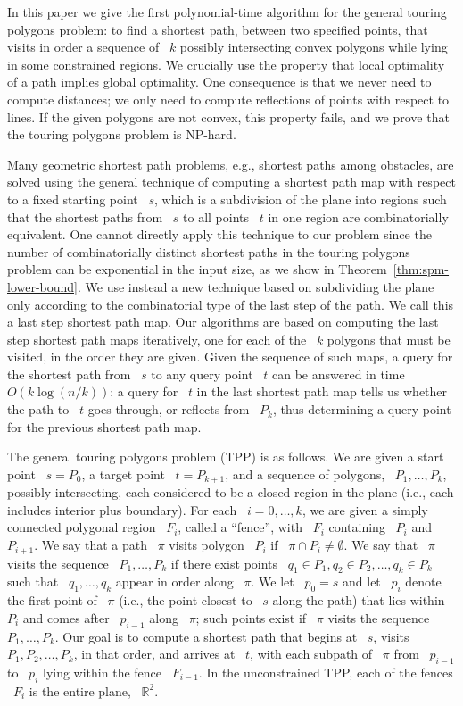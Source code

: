 \documentclass[11pt]{article}
\begin{document}
In this paper we give the first polynomial-time algorithm for the general touring polygons problem: to find a shortest path, between two specified points, that visits in order a sequence of ~\(k\) possibly intersecting convex polygons while lying in some constrained regions.
We crucially use the property that local optimality of a path implies global optimality.
One consequence is that we never need to compute distances; we only need to compute reflections of points with respect to lines.
If the given polygons are not convex, this property fails, and we prove that the touring polygons problem is NP-hard.

Many geometric shortest path problems, e.g., shortest paths among obstacles, are solved using the general technique of computing a shortest path map with respect to a fixed starting point ~\(s\), which is a subdivision of the plane into regions such that the shortest paths from ~\(s\) to all points ~\(t\) in one region are combinatorially equivalent.
One cannot directly apply this technique to our problem since the number of combinatorially distinct shortest paths in the touring polygons problem can be exponential in the input size, as we show in Theorem~\ref{thm:spm-lower-bound}.
We use instead a new technique based on subdividing the plane only according to the combinatorial type of the last step of the path.
We call this a last step shortest path map.
Our algorithms are based on computing the last step shortest path maps iteratively, one for each of the ~\(k\) polygons that must be visited, in the order they are given.
Given the sequence of such maps, a query for the shortest path from ~\(s\) to any query point ~\(t\) can be answered in time ~\(O(k\log(n/k))\): a query for ~\(t\) in the last shortest path map tells us whether the path to ~\(t\) goes through, or reflects from ~\(P_k\), thus determining a query point for the previous shortest path map.

The general touring polygons problem (TPP) is as follows.
We are given a start point ~\(s = P_0\), a target point ~\(t = P_{k+1}\), and a sequence of polygons, ~\(P_1, \ldots, P_k\), possibly intersecting, each considered to be a closed region in the plane (i.e., each includes interior plus boundary).
For each ~\(i = 0, \ldots, k\), we are given a simply connected polygonal region ~\(F_i\), called a ``fence'', with ~\(F_i\) containing ~\(P_i\) and ~\(P_{i+1}\).
We say that a path ~\(\pi\) visits polygon ~\(P_i\) if ~\(\pi \cap P_i \neq \emptyset\).
We say that ~\(\pi\) visits the sequence ~\(P_1, \ldots, P_k\) if there exist points ~\(q_1 \in P_1, q_2 \in P_2, \ldots, q_k \in P_k\) such that ~\(q_1, \ldots, q_k\) appear in order along ~\(\pi\).
We let ~\(p_0 = s\) and let ~\(p_i\) denote the first point of ~\(\pi\) (i.e., the point closest to ~\(s\) along the path) that lies within ~\(P_i\) and comes after ~\(p_{i-1}\) along ~\(\pi\); such points exist if ~\(\pi\) visits the sequence ~\(P_1, \ldots, P_k\).
Our goal is to compute a shortest path that begins at ~\(s\), visits ~\(P_1, P_2, \ldots, P_k\), in that order, and arrives at ~\(t\), with each subpath of ~\(\pi\) from ~\(p_{i-1}\) to ~\(p_i\) lying within the fence ~\(F_{i-1}\).
In the unconstrained TPP, each of the fences ~\(F_i\) is the entire plane, ~\(\mathbb{R}^2\).
\end{document}
